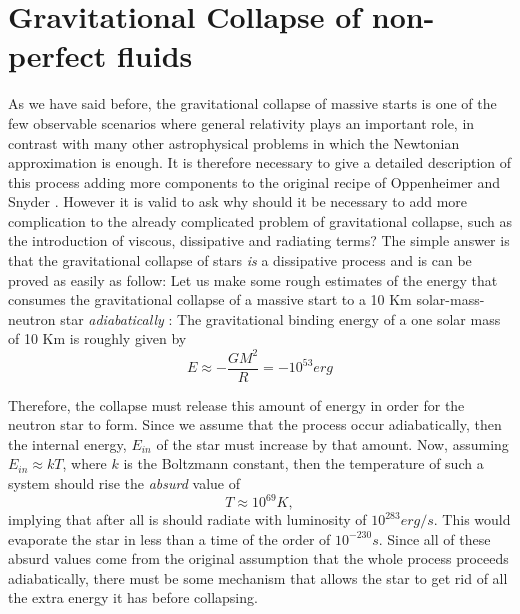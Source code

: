 \chapter{Gravitational Collapse of non-perfect fluids}
As we have said before, the gravitational collapse of massive starts is one of the few observable scenarios where general relativity plays an important role, in contrast with many other astrophysical problems in which the Newtonian approximation is enough. It is therefore necessary to give a detailed description of this process adding more components to the original recipe of Oppenheimer and Snyder \cite{oppenheimer1939continued}. However it is valid to ask why should it be necessary to add more complication to the already complicated problem of gravitational collapse, such as the introduction of viscous, dissipative and radiating terms? The simple answer is that the gravitational collapse of stars \textit{is} a dissipative process and is can be proved as easily as follow: Let us make some rough estimates of the energy that consumes the gravitational collapse of a massive start to a 10 Km solar-mass-neutron star \textit{adiabatically} \cite{herrera2009relativistic}: The gravitational binding energy of a one solar mass of 10 Km is roughly given by
$$
E\approx -\frac{G M^2}{R} = -10^{53} erg
$$ 

Therefore, the collapse must release this amount of energy in order for the neutron star to form. Since we assume that the process occur adiabatically, then the internal energy, $E_{in}$ of the star must increase by that amount.  Now, assuming $E_{in} \approx kT$, where $k$ is the Boltzmann constant, then the temperature of such a system should rise the \textit{absurd} value of
\begin{equation}
\label{eq:TemperatureRiseAdiabCollapse}
	T\approx 10^{69} K,
\end{equation}
implying that after all is should radiate with luminosity of $10^{283} erg/s$. This would evaporate the star in less than a time of the order of $10^{-230}s$. Since all of these absurd values come from the original assumption that the whole process proceeds adiabatically, there must be some mechanism that allows the star to get rid of all the extra energy it has before collapsing\cite{herrera2009relativistic}.
